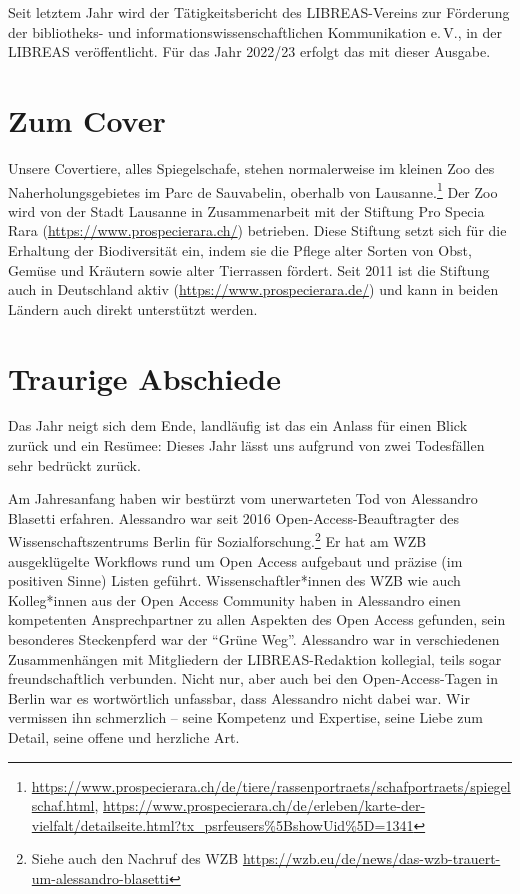 \documentclass[a4paper,
fontsize=11pt,
oneside,
numbers=noperiodatend,
parskip=half-,
bibliography=totoc,
final
]{scrartcl}
\begin{document}
Seit letztem Jahr wird der Tätigkeitsbericht des LIBREAS-Vereins zur
Förderung der bibliotheks- und informationswissenschaftlichen
Kommunikation e.\,V., in der LIBREAS veröffentlicht. Für das Jahr
2022/23 erfolgt das mit dieser Ausgabe.

\hypertarget{zum-cover}{%
\section{Zum Cover}\label{zum-cover}}

Unsere Covertiere, alles Spiegelschafe, stehen normalerweise im kleinen
Zoo des Naherholungsgebietes im Parc de Sauvabelin, oberhalb von
Lausanne.\footnote{\url{https://www.prospecierara.ch/de/tiere/rassenportraets/schafportraets/spiegelschaf.html},
  \url{https://www.prospecierara.ch/de/erleben/karte-der-vielfalt/detailseite.html?tx_psrfeusers\%5BshowUid\%5D=1341}}
Der Zoo wird von der Stadt Lausanne in Zusammenarbeit mit der Stiftung
Pro Specia Rara (\url{https://www.prospecierara.ch/}) betrieben. Diese
Stiftung setzt sich für die Erhaltung der Biodiversität ein, indem sie
die Pflege alter Sorten von Obst, Gemüse und Kräutern sowie alter
Tierrassen fördert. Seit 2011 ist die Stiftung auch in Deutschland aktiv
(\url{https://www.prospecierara.de/}) und kann in beiden Ländern auch
direkt unterstützt werden.

\hypertarget{traurige-abschiede}{%
\section{Traurige Abschiede}\label{traurige-abschiede}}

Das Jahr neigt sich dem Ende, landläufig ist das ein Anlass für einen
Blick zurück und ein Resümee: Dieses Jahr lässt uns aufgrund von zwei
Todesfällen sehr bedrückt zurück.

Am Jahresanfang haben wir bestürzt vom unerwarteten Tod von Alessandro
Blasetti erfahren. Alessandro war seit 2016 Open-Access-Beauftragter des
Wissenschaftszentrums Berlin für Sozialforschung.\footnote{Siehe auch
  den Nachruf des WZB
  \url{https://wzb.eu/de/news/das-wzb-trauert-um-alessandro-blasetti}}
Er hat am WZB ausgeklügelte Workflows rund um Open Access aufgebaut und
präzise (im positiven Sinne) Listen geführt. Wissenschaftler*innen des
WZB wie auch Kolleg*innen aus der Open Access Community haben in
Alessandro einen kompetenten Ansprechpartner zu allen Aspekten des Open
Access gefunden, sein besonderes Steckenpferd war der \enquote{Grüne
Weg}. Alessandro war in verschiedenen Zusammenhängen mit Mitgliedern der
LIBRE\-AS-Redaktion kollegial, teils sogar freundschaftlich verbunden.
Nicht nur, aber auch bei den Open-Access-Tagen in Berlin war es
wortwörtlich unfassbar, dass Alessandro nicht dabei war. Wir vermissen
ihn schmerzlich -- seine Kompetenz und Expertise, seine Liebe zum
Detail, seine offene und herzliche Art.
\end{document}
